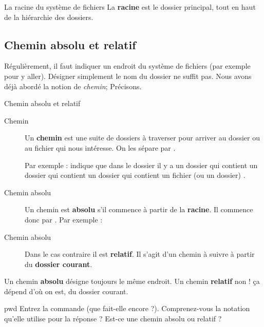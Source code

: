 \documentclass[a4paper,11pt]{style-esi/td}
\begin{document}
		\begin{theorie}{La racine du système de fichiers}
			La \textbf{racine} est le dossier principal, 
			tout en haut de la hiérarchie des dossiers.
		\end{theorie}

	\subsection{Chemin absolu et relatif}

		
		\bigskip
		Régulièrement, il faut indiquer un endroit du système de fichiers 
		(par exemple pour y aller). 
		Désigner simplement le nom du dossier ne suffit pas.  
		Nous avons déjà abordé la notion de \emph{chemin}; Précisons.

		\begin{theorie}{Chemin absolu et relatif}
			\begin{description}
			\item[Chemin]
				Un \textbf{chemin} est une suite de dossiers à traverser 
				pour arriver au dossier ou au fichier qui nous intéresse.
				On les sépare par \og{}\samp{/}\fg{}.

				Par exemple : 
				indique que dans le dossier 
				il y a un dossier 
				qui contient un dossier  
				qui contient un dossier  
				qui contient un fichier (ou un dossier) .
			\item[Chemin absolu]
				Un chemin est \textbf{absolu} 
				s'il commence à partir de la \textbf{racine}.
				Il commence donc par \og{}\samp{/}\fg{}.
				Par exemple : 
			\item[Chemin absolu]
				Dans le cas contraire il est \textbf{relatif}.
				Il s'agit d'un chemin à suivre à partir du \textbf{dossier courant}.
			\end{description}
		\end{theorie}

		\begin{alertbox}
			Un chemin \textbf{absolu} désigne toujours le même endroit.
			Un chemin \textbf{relatif} non ! \c ca dépend d'où on est,
			du dossier courant.
		\end{alertbox}

		\begin{Exercice}{pwd}
			Entrez la commande  (que fait-elle encore ?). 
			Comprenez-vous la notation qu'elle utilise pour la réponse ?
			Est-ce une chemin absolu ou relatif ?
		\end{Exercice}
\end{document}
